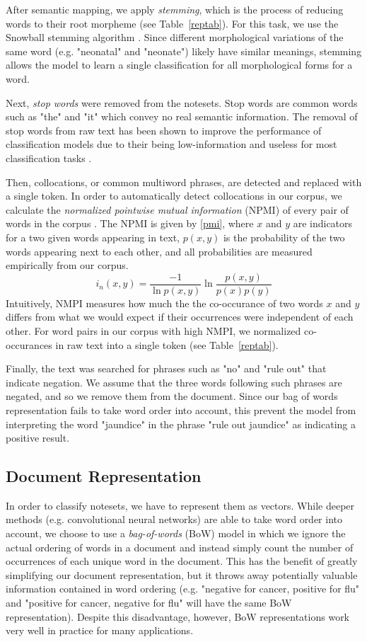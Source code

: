 \documentclass[conference]{IEEEtran}
\begin{document}
After semantic mapping, we apply \textit{stemming}, which is the process of reducing words to their root morpheme (see Table~\ref{reptab}). For this task, we use the Snowball stemming algorithm \cite{Porter}. Since different morphological variations of the same word (e.g. "neonatal" and "neonate") likely have similar meanings, stemming allows the model to learn  a single classification for all morphological forms for a word.

Next, \textit{stop words} were removed from the notesets. Stop words are common words such as "the" and "it" which convey no real semantic information. The removal of stop words from raw text has been shown to improve the performance of classification models due to their being low-information and useless for most classification tasks \cite{Silva}. 

Then, collocations, or common multiword phrases, are detected and replaced with a single token. In order to automatically detect collocations in our corpus, we calculate the \textit{normalized pointwise mutual information} (NPMI) of every pair of words in the corpus \cite{Bouma}. The NPMI is given by \eqref{pmi}, where $x$ and $y$ are indicators for a two given words appearing in text, $p(x,y)$ is the probability of the two words appearing next to each other, and all probabilities are measured empirically from our corpus.
\begin{equation}
i_n(x,y) = \frac{-1}{\ln p(x,y)}\ln \frac{p(x,y)}{p(x)p(y)}\label{pmi}
\end{equation}
Intuitively, NMPI measures how much the the co-occurance of two words $x$ and $y$ differs from what we would expect if their occurrences were independent of each other. For word pairs in our corpus with high NMPI, we normalized co-occurances in raw text into a single token (see Table~\ref{reptab}).

Finally, the text was searched for phrases such as "no" and "rule out" that indicate negation. We assume that the three words following such phrases are negated, and so we remove them from the document. Since our bag of words representation fails to take word order into account, this prevent the model from interpreting the word "jaundice" in the phrase "rule out jaundice" as indicating a positive result. 
\subsection{Document Representation}\label{AA}
In order to classify notesets, we have to represent them as vectors. While deeper methods (e.g. convolutional neural networks) are able to take word order into account, we choose to use a \textit{bag-of-words} (BoW) model in which we ignore the actual ordering of words in a document and instead simply count the number of occurrences of each unique word in the document. This has the benefit of greatly simplifying our document representation, but it throws away potentially valuable information contained in word ordering (e.g. "negative for cancer, positive for flu" and "positive for cancer, negative for flu" will have the same BoW representation). Despite this disadvantage, however, BoW representations work very well in practice for many applications.
\end{document}
